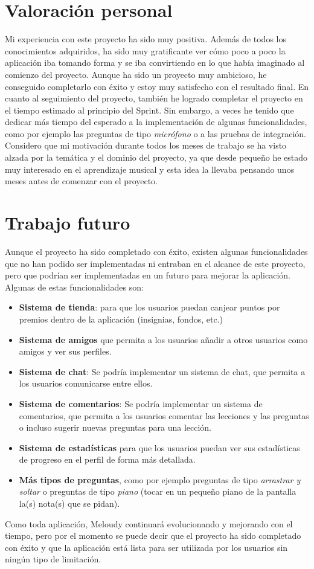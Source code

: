 \section{Valoración personal}
\label{sec:valoracion_personal}
Mi experiencia con este proyecto ha sido muy positiva. Además de todos los conocimientos adquiridos, ha sido muy gratificante ver cómo poco a poco la aplicación iba tomando forma y se iba convirtiendo en lo que había imaginado al comienzo del proyecto. Aunque ha sido un proyecto muy ambicioso, he conseguido completarlo con éxito y estoy muy satisfecho con el resultado final.
En cuanto al seguimiento del proyecto, también he logrado completar el proyecto en el tiempo estimado al principio del Sprint. Sin embargo, a veces he tenido que dedicar más tiempo del esperado a la implementación de algunas funcionalidades, como por ejemplo las preguntas de tipo \textit{micrófono} o a las pruebas de integración. 
Considero que mi motivación durante todos los meses de trabajo se ha visto alzada por la temática y el dominio del proyecto, ya que desde pequeño he estado muy interesado en el aprendizaje musical y esta idea la llevaba pensando unos meses antes de comenzar con el proyecto. 


\section{Trabajo futuro}
\label{sec:trabajo_futuro}
Aunque el proyecto ha sido completado con éxito, existen algunas funcionalidades que no han podido ser implementadas ni entraban en el alcance de este proyecto, pero que podrían ser implementadas en un futuro para mejorar la aplicación. Algunas de estas funcionalidades son:
\begin{itemize}
    \item \textbf{Sistema de tienda}: para que los usuarios puedan canjear puntos por premios dentro de la aplicación (insignias, fondos, etc.)
    \item \textbf{Sistema de amigos} que permita a los usuarios añadir a otros usuarios como amigos y ver sus perfiles.
    \item \textbf{Sistema de chat}: Se podría implementar un sistema de chat, que permita a los usuarios comunicarse entre ellos.
    \item \textbf{Sistema de comentarios}: Se podría implementar un sistema de comentarios, que permita a los usuarios comentar las lecciones y las preguntas o incluso sugerir nuevas preguntas para una lección.
    \item \textbf{Sistema de estadísticas} para que los usuarios puedan ver sus estadísticas de progreso en el perfil de forma más detallada.
    \item \textbf{Más tipos de preguntas}, como por ejemplo preguntas de tipo \textit{arrastrar y soltar} o preguntas de tipo \textit{piano} (tocar en un pequeño piano de la pantalla la(s) nota(s) que se pidan).
\end{itemize}

Como toda aplicación, Meloudy continuará evolucionando y mejorando con el tiempo, pero por el momento se puede decir que el proyecto ha sido completado con éxito y que la aplicación está lista para ser utilizada por los usuarios sin ningún tipo de limitación.

